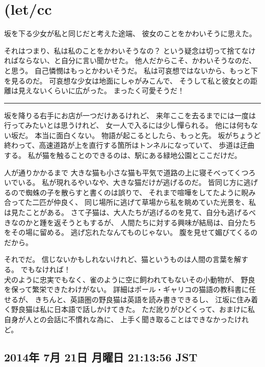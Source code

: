 \documentclass[]{book}
\begin{document}
\section{(let/cc}

坂を下る少女が私と同じだと考えた途端、 彼女のことをかわいそうに思えた。

それはつまり、私は私のことをかわいそうなの？
という疑念は切って捨てなければならない、と自分に言い聞かせた。
他人だからこそ、かわいそうなのだ、と思う。
自己憐憫はもっとかわいそうだ。
私は可哀想ではないから、もっと下を見るのだ。
可哀想な少女は地面にしゃがみこんで、
そうして私と彼女との距離は見えないくらいに広がった。
まったく可愛そうだ！

\begin{center}\rule{3in}{0.4pt}\end{center}

坂を降りる右手にお店が一つだけあるけれど、
来年ここを去るまでには一度は行ってみたいとは思うけれど、
女一人で入るには少し憚られる。 他には何もない坂だ。 本当に面白くない。
物語が起こるとしたら、もっと先。
坂がちょうど終わって、高速道路が上を直行する箇所はトンネルになっていて、
歩道は迂曲する。
私が猫を触ることのできるのは、駅にある緑地公園とここだけだ。

人が通りかかるまで
大きな猫も小さな猫も平気で道路の上に寝そべってくつろいでいる。
私が現れるやいなや、大きな猫だけが逃げるのだ。
皆同じ方に逃げるので蜘蛛の子を散らすと書くのは誤りで、
それまで喧嘩をしてたように睨み合ってた二匹が仲良く、
同じ場所に逃げて草場から私を眺めていた光景を、私は見たことがある。
さて子猫は、大人たちが逃げるのを見て、自分も逃げるべきなのかと踵を返そうともするが、
人間たちに対する興味が結局は、自分たちをその場に留める。
逃げ忘れたなんてものじゃない。 腹を見せて媚びてくるのだから。

それでだ。
信じないかもしれないけれど、猫というものは人間の言葉を解する。
でもなければ！\\犬のように忠実でもなく、雀のように空に飼われてもないその小動物が、
野良を保って繁栄できたわけがない。
詳細はポール・ギャリコの猫語の教科書に任せるが、
きちんと、英語圏の野良猫は英語を読み書きできるし、
江坂に住み着く野良猫は私に日本語で話しかけてきた。
ただ訛りがひどくって、おまけに私自身が人との会話に不慣れな為に、
上手く聞き取ることはできなかったけれど。

\subsection{2014年 7月 21日 月曜日 21:13:56 JST}
\end{document}
